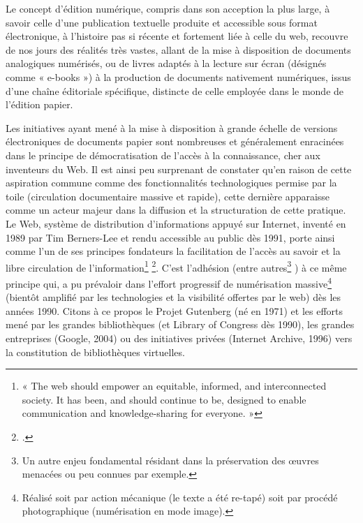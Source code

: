 Le concept d’édition numérique, compris dans son acception la plus large, à savoir celle d’une publication textuelle produite et accessible sous format électronique, à l’histoire pas si récente et fortement liée à celle du web, recouvre de nos jours des réalités très vastes, allant de la mise à disposition de documents analogiques numérisés, ou de livres adaptés à la lecture sur écran (désignés comme « e-books ») à la production de documents nativement numériques, issus d’une chaîne éditoriale spécifique, distincte de celle employée dans le monde de l’édition papier. 

Les initiatives ayant mené à la mise à disposition à grande échelle de versions électroniques de documents papier sont nombreuses et généralement enracinées dans le principe de démocratisation de l’accès à la connaissance, cher aux inventeurs du Web. Il est ainsi peu surprenant de constater qu’en raison de cette aspiration commune comme des fonctionnalités technologiques permise par la toile (circulation documentaire massive et rapide), cette dernière apparaisse comme un acteur majeur dans la diffusion et la structuration de cette pratique. 
Le Web, système de distribution d’informations appuyé sur Internet, inventé en 1989 par Tim Berners-Lee et rendu accessible au public dès 1991, porte ainsi comme l’un de ses principes fondateurs la facilitation de l’accès au savoir et la libre circulation de l’information\footnote{« The web should empower an equitable, informed, and interconnected society. It has been, and should continue to be, designed to enable communication and knowledge-sharing for everyone. »} \footcite{noauthor_ethical_nodate}. C’est l’adhésion (entre autres\footnote{Un autre enjeu fondamental résidant dans la préservation des œuvres menacées ou peu connues par exemple.}  )  à ce même principe qui, a pu prévaloir dans l’effort progressif de numérisation massive\footnote{ Réalisé soit par action mécanique (le texte a été re-tapé) soit par procédé photographique (numérisation en mode image).} (bientôt amplifié par les technologies et la visibilité offertes par le web) dès les années 1990. Citons à ce propos le Projet Gutenberg (né en 1971) et les efforts mené par les grandes bibliothèques (\bnf et Library of Congress dès 1990), les grandes entreprises (Google, 2004) ou des initiatives privées (Internet Archive, 1996)  vers la constitution de bibliothèques virtuelles. 


